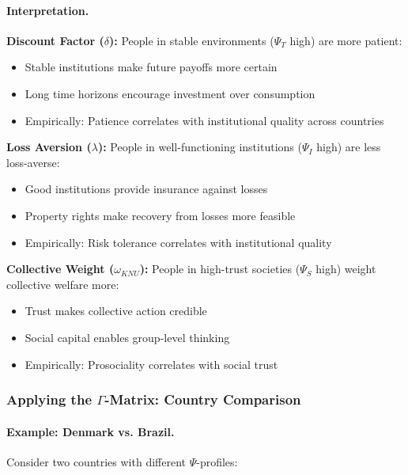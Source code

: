\paragraph{Interpretation.}

\textbf{Discount Factor ($\delta$):}
People in stable environments ($\Psi_T$ high) are more patient:
\begin{itemize}
\item Stable institutions make future payoffs more certain
\item Long time horizons encourage investment over consumption
\item Empirically: Patience correlates with institutional quality across countries
\end{itemize}

\textbf{Loss Aversion ($\lambda$):}
People in well-functioning institutions ($\Psi_I$ high) are less loss-averse:
\begin{itemize}
\item Good institutions provide insurance against losses
\item Property rights make recovery from losses more feasible
\item Empirically: Risk tolerance correlates with institutional quality
\end{itemize}

\textbf{Collective Weight ($\omega_{KNU}$):}
People in high-trust societies ($\Psi_S$ high) weight collective welfare more:
\begin{itemize}
\item Trust makes collective action credible
\item Social capital enables group-level thinking
\item Empirically: Prosociality correlates with social trust
\end{itemize}

\subsubsection{Applying the $\Gamma$-Matrix: Country Comparison}

\paragraph{Example: Denmark vs. Brazil.}
Consider two countries with different $\Psi$-profiles:

